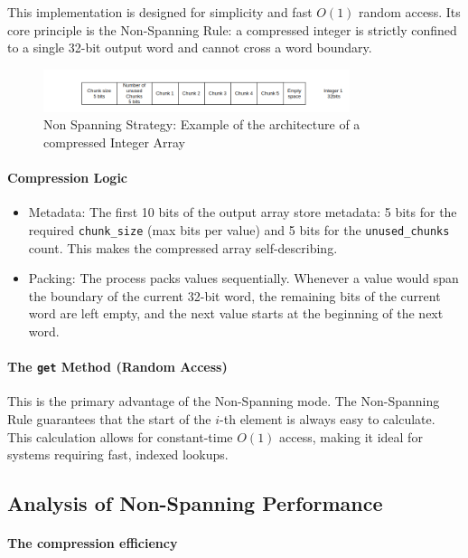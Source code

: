 \documentclass[11pt, a4paper]{article}
\begin{document}
	This implementation is designed for simplicity and fast $O(1)$ random access. Its core principle is the Non-Spanning Rule: a compressed integer is strictly confined to a single 32-bit output word and cannot cross a word boundary.
	
	\begin{figure}[h]
		\centering
		\includegraphics[width=0.8\textwidth]{Grafics/nonspanning.png}
		\caption{Non Spanning Strategy: Example of the architecture of a compressed Integer Array}
		\label{fig:nonspanning_arch}
	\end{figure}
	
	\paragraph{Compression Logic}
	\begin{itemize}
		\item Metadata: The first 10 bits of the output array store metadata: 5 bits for the required \texttt{chunk\_size} (max bits per value) and 5 bits for the \texttt{unused\_chunks} count. This makes the compressed array self-describing.
		\item Packing: The process packs values sequentially. Whenever a value would span the boundary of the current 32-bit word, the remaining bits of the current word are left empty, and the next value starts at the beginning of the next word.
	\end{itemize}
	
	\paragraph{The \texttt{get} Method (Random Access)}
	This is the primary advantage of the Non-Spanning mode. The Non-Spanning Rule guarantees that the start of the $i$-th element is always easy to calculate. This calculation allows for constant-time $O(1)$ access, making it ideal for systems requiring fast, indexed lookups.
	
	\subsection{Analysis of Non-Spanning Performance}
	\label{sec:nonspanning_analysis}
	\paragraph{The compression efficiency}
	
\end{document}
